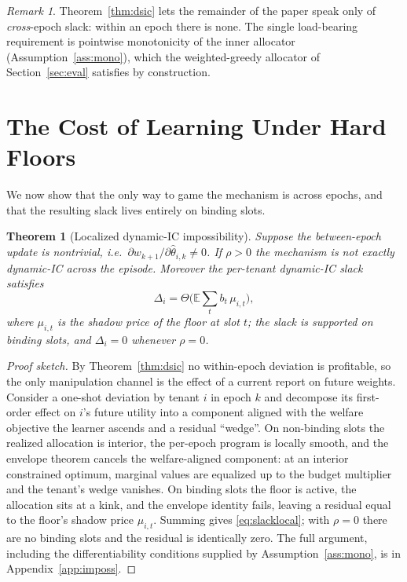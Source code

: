 \documentclass[conference]{IEEEtran}
\newtheorem{theorem}{Theorem}
\theoremstyle{definition}
\theoremstyle{remark}
\newtheorem{remark}{Remark}
\newcommand{\rhobind}{\rho}
\newcommand{\type}{\theta}
\newcommand{\wt}{w}
\newcommand{\bindind}{b}
\newcommand{\Slack}{\Delta}
\newcommand{\E}{\mathbb{E}}
\begin{document}
\begin{remark}
Theorem~\ref{thm:dsic} lets the remainder of the paper speak only of \emph{cross}-epoch slack: within an epoch there is none. The single load-bearing requirement is pointwise monotonicity of the inner allocator (Assumption~\ref{ass:mono}), which the weighted-greedy allocator of Section~\ref{sec:eval} satisfies by construction.
\end{remark}

\section{The Cost of Learning Under Hard Floors}\label{sec:imposs}

We now show that the only way to game the mechanism is across epochs, and that the resulting slack lives entirely on binding slots.

\begin{theorem}[Localized dynamic-IC impossibility]\label{thm:imposs}
Suppose the between-epoch update is nontrivial, i.e.\ $\partial\wt_{k+1}/\partial\hat\type_{i,k}\neq0$. If $\rhobind>0$ the mechanism is not exactly dynamic-IC across the episode. Moreover the per-tenant dynamic-IC slack satisfies
\begin{equation}\label{eq:slacklocal}
\Slack_i=\Theta\!\Big(\E\sum_{t}\bindind_t\,\mu_{i,t}\Big),
\end{equation}
where $\mu_{i,t}$ is the shadow price of the floor at slot $t$; the slack is supported on binding slots, and $\Slack_i=0$ whenever $\rhobind=0$.
\end{theorem}

\begin{proof}[Proof sketch]
By Theorem~\ref{thm:dsic} no within-epoch deviation is profitable, so the only manipulation channel is the effect of a current report on future weights. Consider a one-shot deviation by tenant $i$ in epoch $k$ and decompose its first-order effect on $i$'s future utility into a component aligned with the welfare objective the learner ascends and a residual ``wedge''. On non-binding slots the realized allocation is interior, the per-epoch program is locally smooth, and the envelope theorem cancels the welfare-aligned component: at an interior constrained optimum, marginal values are equalized up to the budget multiplier and the tenant's wedge vanishes. On binding slots the floor is active, the allocation sits at a kink, and the envelope identity fails, leaving a residual equal to the floor's shadow price $\mu_{i,t}$. Summing gives \eqref{eq:slacklocal}; with $\rhobind=0$ there are no binding slots and the residual is identically zero. The full argument, including the differentiability conditions supplied by Assumption~\ref{ass:mono}, is in Appendix~\ref{app:imposs}.
\end{proof}
\end{document}
